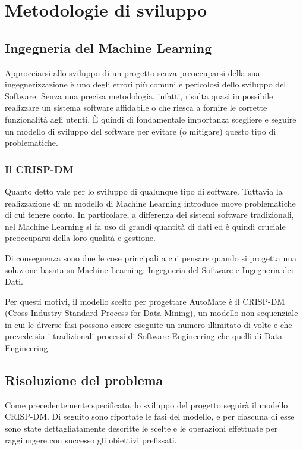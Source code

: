 \chapter{Metodologie di sviluppo}

\section{Ingegneria del Machine Learning}
Approcciarsi allo sviluppo di un progetto senza preoccuparsi della sua ingegnerizzazione è uno degli errori più comuni e pericolosi dello sviluppo del Software. Senza una precisa metodologia, infatti, risulta quasi impossibile realizzare un sistema software affidabile o che riesca a fornire le corrette funzionalità agli utenti. È quindi di fondamentale importanza scegliere e seguire un modello di sviluppo del software per evitare (o mitigare) questo tipo di problematiche.

\subsection{Il CRISP-DM}
Quanto detto vale per lo sviluppo di qualunque tipo di software. Tuttavia la realizzazione di un modello di Machine Learning introduce nuove problematiche di cui tenere conto. In particolare, a differenza dei sistemi software tradizionali, nel Machine Learning si fa uso di grandi quantità di dati ed è quindi cruciale preoccuparsi della loro qualità e gestione.

Di conseguenza sono due le cose principali a cui pensare quando si progetta una soluzione basata su Machine Learning: Ingegneria del Software e Ingegneria dei Dati.

Per questi motivi, il modello scelto per progettare AutoMate è il \mbox{CRISP-DM} (Cross-Industry Standard Process for Data Mining), un modello non sequenziale in cui le diverse fasi possono essere eseguite un numero illimitato di volte e che prevede sia i tradizionali processi di Software Engineering che quelli di Data Engineering.

\medskip
\pagebreak
\section{Risoluzione del problema}
Come precedentemente specificato, lo sviluppo del progetto seguirà il modello CRISP-DM. Di seguito sono riportate le fasi del modello, e per ciascuna di esse sono state dettagliatamente descritte le scelte e le operazioni effettuate per raggiungere con successo gli obiettivi prefissati.

